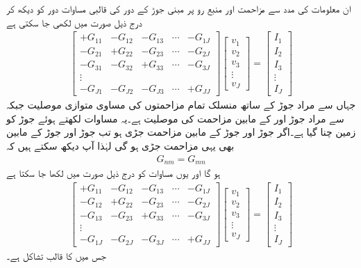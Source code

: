ان معلومات کی مدد سے  مزاحمت اور منبع رو پر مبنی  جوڑ کے دور کی قالبی مساوات  دور کو دیکھ کر درج ذیل صورت میں لکھی جا سکتی ہے
\begin{align}\label{مساوات_جوڑ_عمومی_قالبی_مساوات_الف}
\begin{bmatrix}
+G_{11} & -G_{12} & -G_{13} & \cdots & -G_{1J}\\
-G_{21} & +G_{22} & -G_{23} & \cdots & -G_{2J}\\
-G_{31} & -G_{32} & +G_{33} & \cdots & -G_{3J}\\
\vdots\\
-G_{J1} & -G_{J2} & -G_{J3} & \cdots & +G_{JJ}
\end{bmatrix}
\begin{bmatrix}
v_1\\
v_2\\
v_3\\
\vdots\\
v_J
\end{bmatrix}
=
\begin{bmatrix}
I_1\\
I_2\\
I_3\\
\vdots\\
I_J
\end{bmatrix}
\end{align} 
جہاں  سے مراد جوڑ  کے ساتھ منسلک تمام مزاحمتوں کی مساوی متوازی موصلیت جبکہ  سے مراد جوڑ  اور  کے مابین مزاحمت کی موصلیت ہے۔یہ مساوات لکھتے ہوئے جوڑ  کو زمین چنا گیا ہے۔اگر جوڑ  اور جوڑ  کے مابین مزاحمت  جڑی ہو تب جوڑ  اور جوڑ  کے مابین بھی یہی مزاحمت جڑی ہو گی لہٰذا آپ دیکھ سکتے ہیں کہ 
\begin{align}
G_{nm}=G_{mn}
\end{align}
ہو گا اور یوں مساوات  کو درج ذیل صورت میں لکھا جا سکتا ہے
\begin{align}\label{مساوات_جوڑ_عمومی_قالبی_مساوات_ب}
\begin{bmatrix}
+G_{11} & -G_{12} & -G_{13} & \cdots & -G_{1J}\\
-G_{12} & +G_{22} & -G_{23} & \cdots & -G_{2J}\\
-G_{13} & -G_{23} & +G_{33} & \cdots & -G_{3J}\\
\vdots\\
-G_{1J} & -G_{2J} & -G_{3J} & \cdots & +G_{JJ}
\end{bmatrix}
\begin{bmatrix}
v_1\\
v_2\\
v_3\\
\vdots\\
v_J
\end{bmatrix}
=
\begin{bmatrix}
I_1\\
I_2\\
I_3\\
\vdots\\
I_J
\end{bmatrix}
\end{align}
جس میں  کا قالب تشاکل ہے۔


